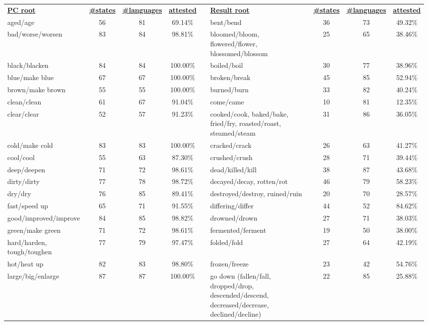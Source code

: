 \begin{tabular}{p{3cm}ccccp{3cm}ccc}
\underline{\textbf{PC root}} & \underline{\textbf{\#states}} & \underline{\textbf{\#languages}} & \underline{\textbf{attested}} & & \underline{\textbf{Result root}} & \underline{\textbf{\#states}} & \underline{\textbf{\#languages}} & \underline{\textbf{attested}} \\
aged/age & 56 & 81 & 69.14\% & & bent/bend & 36 & 73 & 49.32\% \\
bad/worse/worsen & 83 & 84 & 98.81\% & & bloomed/bloom, flowered/flower, blossomed/blossom & 25 & 65 & 38.46\% \\
black/blacken & 84 & 84 & 100.00\% & & boiled/boil & 30 & 77 & 38.96\% \\
blue/make blue & 67 & 67 & 100.00\% & & broken/break & 45 & 85 & 52.94\% \\
brown/make brown & 55 & 55 & 100.00\% & & burned/burn & 33 & 82 & 40.24\% \\
clean/clean & 61 & 67 & 91.04\% & & come/came & 10 & 81 & 12.35\% \\
clear/clear & 52 & 57 & 91.23\% & & cooked/cook, baked/bake, fried/fry, roasted/roast, steamed/steam & 31 & 86 & 36.05\% \\
cold/make cold & 83 & 83 & 100.00\% & & cracked/crack & 26 & 63 & 41.27\% \\
cool/cool & 55 & 63 & 87.30\% & & crushed/crush & 28 & 71 & 39.44\% \\
deep/deepen & 71 & 72 & 98.61\% & & dead/killed/kill & 38 & 87 & 43.68\% \\
dirty/dirty & 77 & 78 & 98.72\% & & decayed/decay, rotten/rot & 46 & 79 & 58.23\% \\
dry/dry & 76 & 85 & 89.41\% & & destroyed/destroy, ruined/ruin & 20 & 70 & 28.57\% \\
fast/speed up & 65 & 71 & 91.55\% & & differing/differ & 44 & 52 & 84.62\% \\
good/improved/improve & 84 & 85 & 98.82\% & & drowned/drown & 27 & 71 & 38.03\% \\
green/make green & 71 & 72 & 98.61\% & & fermented/ferment & 19 & 50 & 38.00\% \\
hard/harden, tough/toughen & 77 & 79 & 97.47\% & & folded/fold & 27 & 64 & 42.19\% \\
hot/heat up & 82 & 83 & 98.80\% & & frozen/freeze & 23 & 42 & 54.76\% \\
large/big/enlarge & 87 & 87 & 100.00\% & & go down (fallen/fall, dropped/drop, descended/descend, decreased/decrease, declined/decline) & 22 & 85 & 25.88\% \\

\end{tabular}
